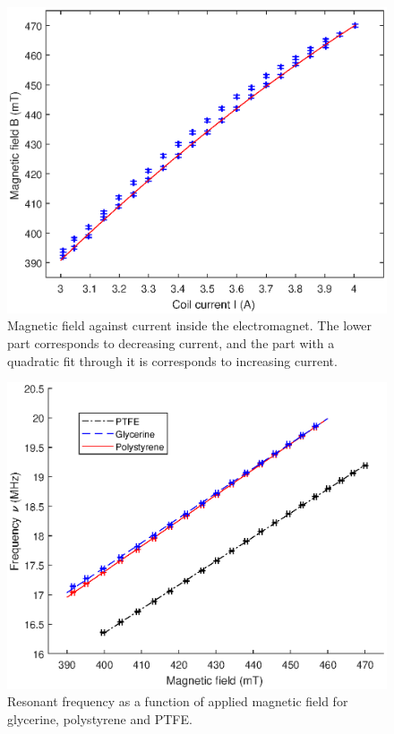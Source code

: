 \documentclass[a4paper]{jpconf}
\numberwithin{equation}{section}
\begin{document}
\begin{figure}[h!]
	\includegraphics[scale=0.67]{NMR_calibration_nocaption_nolegend_red.eps}
	\hspace{2pc}
	\begin{minipage}[b]{2.2in}
		\caption{Magnetic field against current inside the electromagnet. The lower part corresponds to decreasing current, and the part with a quadratic fit through it is corresponds to increasing current.}
		\label{fig: hysteresis curve}
	\end{minipage}
\end{figure}
\begin{figure}[h!]
	\includegraphics[scale=0.67]{NMR_resonances.eps}
	\hspace{2pc}
	\begin{minipage}[b]{2.2in}
		\caption{Resonant frequency as a function of applied magnetic field for glycerine, polystyrene and PTFE.}
		\label{fig: NMR resonances}
	\end{minipage}
\end{figure}
\end{document}
